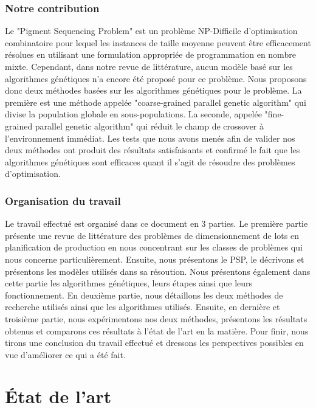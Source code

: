 \documentclass[12pt,a4paper]{article}
\begin{document}
	\section*{Notre contribution}
	Le "Pigment Sequencing Problem" est un problème NP-Difficile d'optimisation combinatoire pour lequel les instances de taille moyenne peuvent être efficacement résolues en utilisant une formulation appropriée de programmation en nombre mixte. Cependant, dans notre revue de littérature, aucun modèle basé sur les algorithmes génétiques n'a encore été proposé pour ce problème. Nous proposons donc deux méthodes basées sur les algorithmes génétiques pour le problème. La première est une méthode appelée "coarse-grained parallel genetic algorithm" qui divise la population globale en sous-populations. La seconde, appelée "fine-grained parallel genetic algorithm" qui réduit le champ de crossover à l'environnement immédiat. Les tests que nous avons menés afin de valider nos deux méthodes ont produit des résultats satisfaisants et confirmé le fait que les algorithmes génétiques sont efficaces quant il s'agit de résoudre des problèmes d'optimisation. 
	 
	\section*{Organisation du travail}

	Le travail effectué est organisé dans ce document en 3 parties. Le première partie présente une revue de littérature des problèmes de dimensionnement de lots en planification de production en nous concentrant sur les classes de problèmes qui nous concerne particulièrement. Ensuite, nous présentons le PSP, le décrivons et présentons les modèles utilisés dans sa résoution. Nous présentons également dans cette partie les algorithmes génétiques, leurs étapes ainsi que leurs fonctionnement. En deuxième partie, nous détaillons les deux méthodes de recherche utilisés ainsi que les algorithmes utilisés. Ensuite, en dernière et troisième partie, nous expérimentons  nos deux méthodes, présentons les résultats obtenus et comparons ces résultats à l'état de l'art en la matière. Pour finir, nous tirons une conclusion du travail effectué et dressons les perspectives possibles en vue d'améliorer ce qui a été fait.
	
	\newpage
	
	\part{État de l'art}
\end{document}
